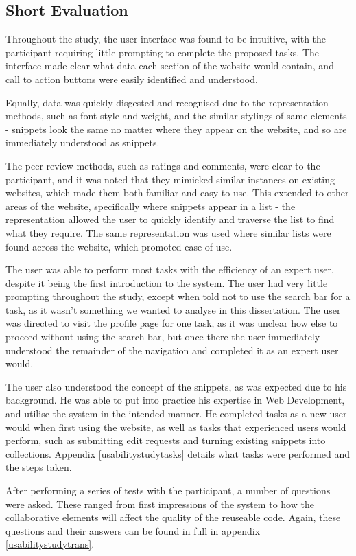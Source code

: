 \subsection{Short Evaluation}
Throughout the study, the user interface was found to be intuitive, with the participant requiring little prompting to complete the proposed tasks.
The interface made clear what data each section of the website would contain, and call to action buttons were easily identified and understood. 

Equally, data was quickly disgested and recognised due to the representation methods, such as font style and weight, and the similar stylings of same elements - snippets look the same no matter where they appear on the website, and so are immediately understood as snippets.

The peer review methods, such as ratings and comments, were clear to the participant, and it was noted that they mimicked similar instances on existing websites, which made them both familiar and easy to use. 
This extended to other areas of the website, specifically where snippets appear in a list - the representation allowed the user to quickly identify and traverse the list to find what they require. 
The same representation was used where similar lists were found across the website, which promoted ease of use.

The user was able to perform most tasks with the efficiency of an expert user, despite it being the first introduction to the system.
The user had very little prompting throughout the study, except when told not to use the search bar for a task, as it wasn't something we wanted to analyse in this dissertation.
The user was directed to visit the profile page for one task, as it was unclear how else to proceed without using the search bar, but once there the user immediately understood the remainder of the navigation and completed it as an expert user would.

The user also understood the concept of the snippets, as was expected due to his background.
He was able to put into practice his expertise in Web Development, and utilise the system in the intended manner.
He completed tasks as a new user would when first using the website, as well as tasks that experienced users would perform, such as submitting edit requests and turning existing snippets into collections.
Appendix \ref{usabilitystudytasks} details what tasks were performed and the steps taken.

After performing a series of tests with the participant, a number of questions were asked. 
These ranged from first impressions of the system to how the collaborative elements will affect the quality of the reuseable code. 
Again, these questions and their answers can be found in full in appendix \ref{usabilitystudytrans}.

